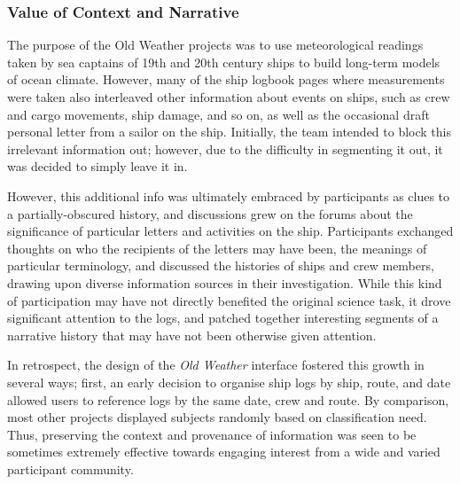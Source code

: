 \documentclass{sigchi}
\begin{document}

\subsubsection{Value of Context and Narrative}

The purpose of the Old Weather projects was to use meteorological readings taken by sea captains of 19th and 20th century ships to build long-term models of ocean climate. However, many of the ship logbook pages where measurements were taken also interleaved other information about events on ships, such as crew and cargo movements, ship damage, and so on, as well as the occasional draft personal letter from a sailor on the ship.  Initially, the team intended to block this irrelevant information out; however, due to the difficulty in segmenting it out, it was decided to simply leave it in. 

However, this additional info was ultimately embraced by participants as clues to a partially-obscured history, and discussions grew on the forums about the significance of particular letters and activities on the ship.  Participants exchanged thoughts on who the recipients of the letters may have been, the meanings of particular terminology, and discussed the histories of ships and crew members, drawing upon diverse information sources in their investigation. While this kind of participation may have not directly benefited the original science task, it drove significant attention to the logs, and patched together interesting segments of a narrative history that may have not been otherwise given attention.  %

In retrospect, the design of the \emph{Old Weather} interface fostered this growth in several ways; first, an early decision to organise ship logs by ship, route, and date allowed users to reference logs by the same date, crew and route. By comparison, most other projects displayed subjects randomly based on classification need. Thus, preserving the context and provenance of information was seen to be sometimes extremely effective towards engaging interest from a wide and varied participant community.
\end{document}
